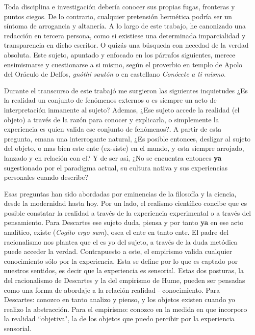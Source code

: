 Toda disciplina e investigación debería conocer sus propias fugas, fronteras y puntos ciegos. De lo contrario, cualquier pretensión hermética podría ser un síntoma de arrogancia y altanería.  A lo largo de este trabajo, he canonizado una redacción en tercera persona, como si existiese una determinada imparcialidad y transparencia en dicho escritor. O quizás una búsqueda con necedad de la verdad absoluta. Este sujeto, apuntado y enfocado en los párrafos siguientes, merece ensimismarse y cuestionarse a si mismo, según el proverbio en templo de Apolo del Oráculo de Delfos, \emph{gnóthi sautón} o en castellano \emph{Conócete a ti mismo}.

Durante el transcurso de este trabajó me surgieron las siguientes inquietudes ¿Es la realidad un conjunto de fenómenos externos o es siempre un acto de interpretación inmanente al sujeto? Ademas, ¿Ese sujeto accede la realidad (el objeto) a través de la razón para conocer y explicarla, o simplemente la experiencia es quien valida ese conjunto de fenómenos?. A partir de esta pregunta, emana una interrogante natural, ¿Es posible entonces, desligar al sujeto del objeto, o mas bien este ente (ex-siste) en el mundo, y esta siempre arrojado, lanzado y en relación con el? Y de ser así, ¿No se encuentra entonces \textbf{ya} sugestionado por el paradigma actual, su cultura nativa y sus experiencias personales cuando describe?

 Esas preguntas han sido abordadas por eminencias de la filosofía y la ciencia, desde la modernidad hasta hoy. Por un lado, el realismo científico concibe que es posible constatar la realidad a través de la experiencia experimental o a través del pensamiento. Para Descartes ese sujeto duda, piensa y por tanto \textbf{ya} en ese acto analítico, existe (\emph{Cogito ergo sum})\cite{descartes2004discurso}, osea el ente en tanto ente. El padre del racionalismo nos plantea que el es yo del sujeto, a través de la duda metódica puede acceder la verdad. Contrapuesto a este, el empirismo valida cualquier conocimiento sólo por la experiencia. Esta se define por lo que es captado por nuestros sentidos, es decir que la experiencia es sensorial. Estas dos posturas, la del racionalismo de Descartes y la del empirismo de Hume, pueden ser pensadas como una forma de abordaje a la relación realidad - conocimiento. Para Descartes: conozco en tanto analizo y pienso, y los objetos existen cuando yo realizo la abstracción. Para el empirismo: conozco en la medida en que incorporo la realidad ``objetiva", la de los objetos que puedo percibir por la experiencia sensorial. 

